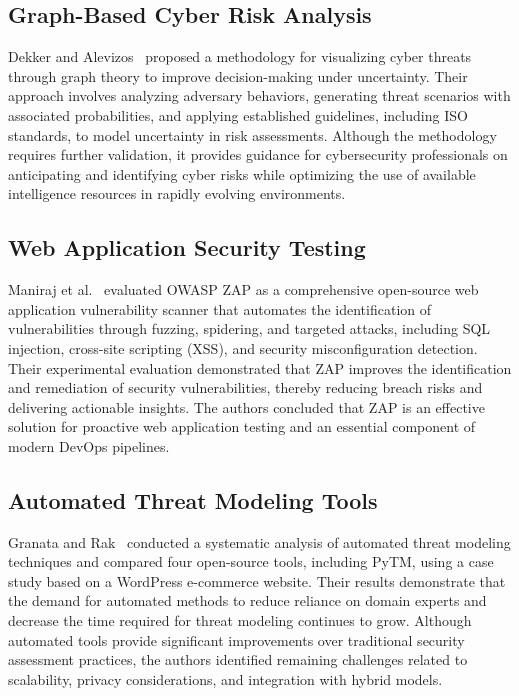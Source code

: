 \documentclass[12pt, a4paper]{article}
\begin{document}
\subsection{Graph-Based Cyber Risk Analysis}

Dekker and Alevizos~\cite{ref4} proposed a methodology for visualizing cyber threats through graph theory to improve decision-making under uncertainty. Their approach involves analyzing adversary behaviors, generating threat scenarios with associated probabilities, and applying established guidelines, including ISO standards, to model uncertainty in risk assessments. Although the methodology requires further validation, it provides guidance for cybersecurity professionals on anticipating and identifying cyber risks while optimizing the use of available intelligence resources in rapidly evolving environments.

\subsection{Web Application Security Testing}

Maniraj et al.~\cite{ref5} evaluated OWASP ZAP as a comprehensive open-source web application vulnerability scanner that automates the identification of vulnerabilities through fuzzing, spidering, and targeted attacks, including SQL injection, cross-site scripting (XSS), and security misconfiguration detection. Their experimental evaluation demonstrated that ZAP improves the identification and remediation of security vulnerabilities, thereby reducing breach risks and delivering actionable insights. The authors concluded that ZAP is an effective solution for proactive web application testing and an essential component of modern DevOps pipelines.

\subsection{Automated Threat Modeling Tools}

Granata and Rak~\cite{ref6} conducted a systematic analysis of automated threat modeling techniques and compared four open-source tools, including PyTM, using a case study based on a WordPress e-commerce website. Their results demonstrate that the demand for automated methods to reduce reliance on domain experts and decrease the time required for threat modeling continues to grow. Although automated tools provide significant improvements over traditional security assessment practices, the authors identified remaining challenges related to scalability, privacy considerations, and integration with hybrid models.
\end{document}
